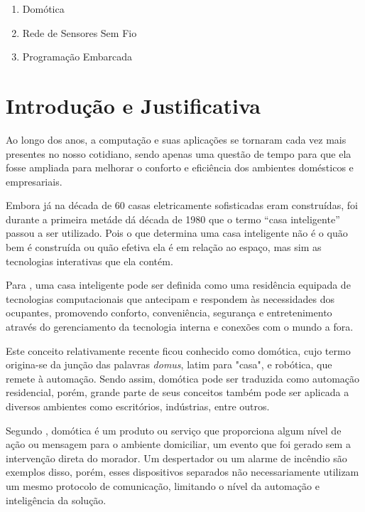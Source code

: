\documentclass[
    12pt,               %
    a4paper,            %
    english,            %
    brazil,             %
    ]{article}
\begin{document}
        \begin{enumerate}
            \item Domótica
			\item Rede de Sensores Sem Fio
			\item Programação Embarcada
        \end{enumerate}


\section{Introdução e Justificativa}
Ao longo dos anos, a computação e suas aplicações se tornaram cada vez mais presentes no nosso cotidiano, sendo apenas
uma questão de tempo para que ela fosse ampliada para melhorar o conforto e eficiência dos ambientes domésticos e empresariais.

Embora já na década de 60 casas eletricamente sofisticadas eram construídas, foi durante a primeira metáde dá década de 1980
que o termo  ``casa inteligente'' passou a ser utilizado. Pois o que determina uma casa inteligente não é o quão bem é construída
ou quão efetiva ela é em relação ao espaço, mas sim as tecnologias interativas que ela contém.\cite{harper2003}

Para , uma casa inteligente pode ser definida como uma residência equipada de tecnologias computacionais que antecipam e
respondem às necessidades dos ocupantes, promovendo conforto, conveniência, segurança e entretenimento através do gerenciamento da tecnologia interna
e conexões com o mundo a fora.

Este conceito relativamente recente ficou conhecido como domótica, cujo termo origina-se da junção das palavras \textit{domus}, latim para "casa",
e robótica, que remete à automação. Sendo assim, domótica pode ser traduzida como automação residencial, porém, grande parte de seus conceitos também pode ser aplicada
a diversos ambientes como escritórios, indústrias, entre outros.

Segundo , domótica é um produto ou serviço que proporciona algum nível de ação ou mensagem para o ambiente domiciliar,
um evento que foi gerado sem a intervenção direta do morador. Um despertador ou um alarme de incêndio são exemplos disso, porém, esses dispositivos separados não necessariamente utilizam
um mesmo protocolo de comunicação, limitando o nível da automação e inteligência da solução.
\end{document}
